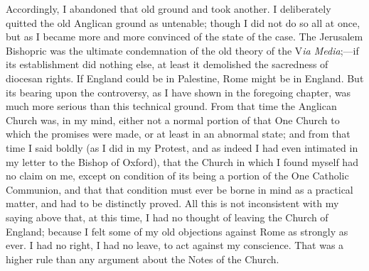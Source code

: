 Accordingly, I abandoned that old ground and took another. I
deliberately quitted the old Anglican ground as untenable; though I did not do so all at once, but as I became more and more convinced of
the state of the case. The Jerusalem Bishopric was the ultimate
condemnation of the old theory of the V\emph{ia Media};—if its
establishment did nothing else, at least it demolished the sacredness of
diocesan rights. If England could be in Palestine, Rome might be in
England. But its bearing upon the controversy, as I have shown in the
foregoing chapter, was much more serious than this technical ground.
From that time the Anglican Church was, in my mind, either not
a normal portion of that One Church to which the promises were made, or
at least in an abnormal state; and from that time I said boldly (as I
did in my Protest, and as indeed I had even intimated in my letter to
the Bishop of Oxford), that the Church in which I found myself
had no claim on me, except on condition of its being a portion of the
One Catholic Communion, and that that condition must ever be borne in
mind as a practical matter, and had to be distinctly proved. All this is
not inconsistent with my saying above that, at
this time, I had no thought of leaving the Church of
England; because I felt some of my old objections against Rome as
strongly as ever. I had no right, I had no leave, to act against my
conscience. That was a higher rule than any argument about the Notes of
the Church.

